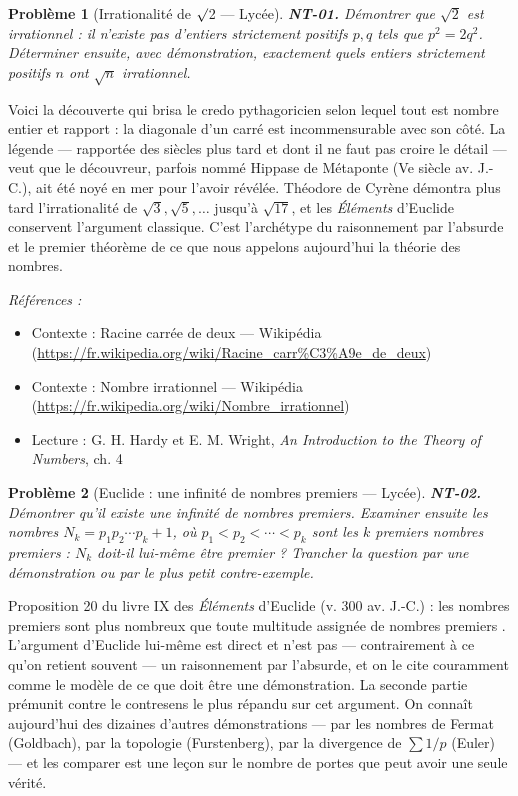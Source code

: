 \documentclass[11pt]{article}
\newtheorem{problem}{Problème}
\newenvironment{refs}{\par\small\noindent\emph{Références :}\begin{itemize}\setlength\itemsep{0pt}}{\end{itemize}\normalsize}
\begin{document}
\begin{problem}[{Irrationalité de $\surd$2 --- Lycée}]
\textbf{NT-01.} Démontrer que $\sqrt{2}$ est irrationnel : il n'existe pas
d'entiers strictement positifs $p, q$ tels que $p^2 = 2q^2$. Déterminer ensuite, avec
démonstration, exactement quels entiers strictement positifs $n$ ont $\sqrt{n}$ irrationnel.
\end{problem}

\noindent Voici la découverte qui brisa le credo pythagoricien selon lequel tout est nombre
entier et rapport : la diagonale d'un carré est incommensurable avec son côté. La légende ---
rapportée des siècles plus tard et dont il ne faut pas croire le détail --- veut que le découvreur,
parfois nommé Hippase de Métaponte (Ve siècle av. J.-C.), ait été noyé en mer pour l'avoir
révélée. Théodore de Cyrène démontra plus tard l'irrationalité de $\sqrt{3}, \sqrt{5}, \ldots$
jusqu'à $\sqrt{17}$, et les \textit{Éléments} d'Euclide conservent l'argument classique. C'est
l'archétype du raisonnement par l'absurde et le premier théorème de ce que nous appelons aujourd'hui
la théorie des nombres.

\begin{refs}
\item Contexte : Racine carrée de deux --- Wikipédia (\url{https://fr.wikipedia.org/wiki/Racine_carr%C3%A9e_de_deux})
\item Contexte : Nombre irrationnel --- Wikipédia (\url{https://fr.wikipedia.org/wiki/Nombre_irrationnel})
\item Lecture : G. H. Hardy et E. M. Wright, \textit{An Introduction to the Theory of Numbers}, ch. 4
\end{refs}

\bigskip

\begin{problem}[{Euclide : une infinité de nombres premiers --- Lycée}]
\textbf{NT-02.} Démontrer qu'il existe une infinité de nombres premiers.
Examiner ensuite les nombres $N_k = p_1 p_2 \cdots p_k + 1$, où
$p_1 < p_2 < \cdots < p_k$ sont les $k$ premiers nombres premiers : $N_k$ doit-il
lui-même être premier ? Trancher la question par une démonstration ou par le plus petit
contre-exemple.
\end{problem}

\noindent Proposition 20 du livre IX des \textit{Éléments} d'Euclide (v. 300 av. J.-C.) :
\og{} les nombres premiers sont plus nombreux que toute multitude assignée de nombres premiers \fg{}.
L'argument d'Euclide lui-même est direct et n'est pas --- contrairement à ce qu'on retient souvent ---
un raisonnement par l'absurde, et on le cite couramment comme le modèle de ce que doit être une
démonstration. La seconde partie prémunit contre le contresens le plus répandu sur cet argument. On
connaît aujourd'hui des dizaines d'autres démonstrations --- par les nombres de Fermat (Goldbach), par
la topologie (Furstenberg), par la divergence de $\sum 1/p$ (Euler) --- et les comparer est une
leçon sur le nombre de portes que peut avoir une seule vérité.
\end{document}
